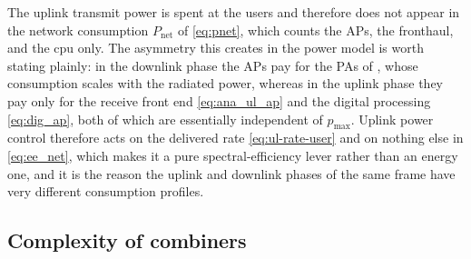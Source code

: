 The uplink transmit power is spent at the users and therefore does not appear in
the network consumption $P_{\mathrm{net}}$ of \eqref{eq:pnet}, which counts the
APs, the fronthaul, and the \gls{cpu} only. The asymmetry this creates in the
power model is worth stating plainly: in the downlink phase the APs pay for the
PAs of , whose consumption scales with the radiated power,
whereas in the uplink phase they pay only for the receive front end
\eqref{eq:ana_ul_ap} and the digital processing \eqref{eq:dig_ap}, both of which
are essentially independent of $p_{\max}$. Uplink power control therefore acts on
the delivered rate \eqref{eq:ul-rate-user} and on nothing else in
\eqref{eq:ee_net}, which makes it a pure spectral-efficiency lever rather than an
energy one, and it is the reason the uplink and downlink phases of the same frame
have very different consumption profiles.


\subsection{Complexity of combiners}
